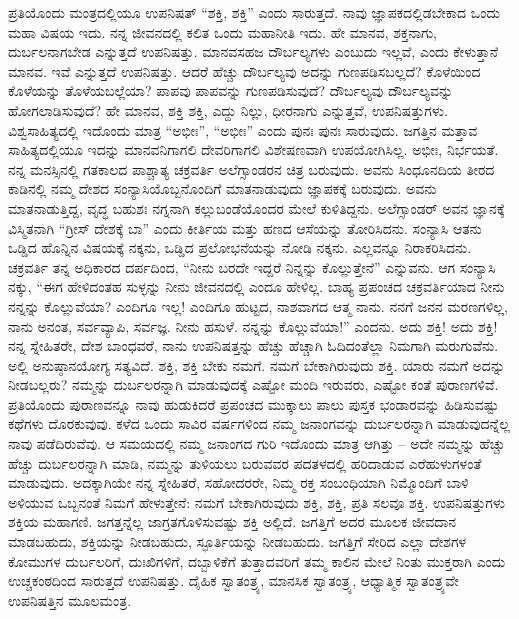 ಪ್ರತಿಯೊಂದು ಮಂತ್ರದಲ್ಲಿಯೂ ಉಪನಿಷತ್​ “ಶಕ್ತಿ, ಶಕ್ತಿ” ಎಂದು ಸಾರುತ್ತದೆ. ನಾವು ಜ್ಞಾಪಕದಲ್ಲಿಡಬೇಕಾದ ಒಂದು ಮಹಾ ವಿಷಯ ಇದು. ನನ್ನ ಜೀವನದಲ್ಲಿ ಕಲಿತ ಒಂದು ಮಹಾನೀತಿ ಇದು. ಹೇ ಮಾನವ, ಶಕ್ತನಾಗು, ದುರ್ಬಲನಾಗಬೇಡ ಎನ್ನುತ್ತದೆ ಉಪನಿಷತ್ತು. ಮಾನವಸಹಜ ದೌರ್ಬಲ್ಯಗಳು ಎಂಬುದು ಇಲ್ಲವೆ, ಎಂದು ಕೇಳುತ್ತಾನೆ ಮಾನವ. ಇವೆ ಎನ್ನುತ್ತದೆ ಉಪನಿಷತ್ತು. ಆದರೆ ಹೆಚ್ಚು ದೌರ್ಬಲ್ಯವು ಅದನ್ನು ಗುಣಪಡಿಸಬಲ್ಲದೆ? ಕೊಳೆಯಿಂದ ಕೊಳೆಯನ್ನು ತೊಳೆಯಬಲ್ಲೆಯಾ? ಪಾಪವು ಪಾಪವನ್ನು ಗುಣಪಡಿಸುವುದೆ? ದೌರ್ಬಲ್ಯವು ದೌರ್ಬಲ್ಯವನ್ನು ಹೋಗಲಾಡಿಸುವುದೆ? ಹೇ ಮಾನವ, ಶಕ್ತಿ ಶಕ್ತಿ, ಎದ್ದು ನಿಲ್ಲು, ಧೀರನಾಗು ಎನ್ನುತ್ತವೆ, ಉಪನಿಷತ್ತುಗಳು. ವಿಶ್ವಸಾಹಿತ್ಯದಲ್ಲಿ ಇದೊಂದು ಮಾತ್ರ “ಅಭೀಃ”, “ಅಭೀಃ” ಎಂದು ಪುನಃ ಪುನಃ ಸಾರುವುದು. ಜಗತ್ತಿನ ಮತ್ತಾವ ಸಾಹಿತ್ಯದಲ್ಲಿಯೂ ಇದನ್ನು ಮಾನವನಿಗಾಗಲಿ ದೇವರಿಗಾಗಲಿ ವಿಶೇಷಣವಾಗಿ ಉಪಯೋಗಿಸಿಲ್ಲ. ಅಭೀಃ, ನಿರ್ಭಯತೆ. ನನ್ನ ಮನಸ್ಸಿನಲ್ಲಿ ಗತಕಾಲದ ಪಾಶ್ಚಾತ್ಯ ಚಕ್ರವರ್ತಿ ಅಲೆಗ್ಸಾಂಡರನ ಚಿತ್ರ ಬರುವುದು. ಅವನು ಸಿಂಧೂನದಿಯ ತೀರದ ಕಾಡಿನಲ್ಲಿ ನಮ್ಮ ದೇಶದ ಸಂನ್ಯಾಸಿಯೊಬ್ಬನೊಂದಿಗೆ ಮಾತನಾಡುವುದು ಜ್ಞಾಪಕಕ್ಕೆ ಬರುವುದು. ಅವನು ಮಾತನಾಡುತ್ತಿದ್ದ, ವೃದ್ಧ ಬಹುಶಃ ನಗ್ನನಾಗಿ ಕಲ್ಲುಬಂಡೆಯೊಂದರ ಮೇಲೆ ಕುಳಿತಿದ್ದನು. ಅಲೆಗ್ಸಾಂಡರ್​ ಅವನ ಜ್ಞಾನಕ್ಕೆ ವಿಸ್ಮಿತನಾಗಿ “ಗ್ರೀಸ್​ ದೇಶಕ್ಕೆ ಬಾ” ಎಂದು ಕೀರ್ತಿಯ ಮತ್ತು ಹಣದ ಆಸೆಯನ್ನು ತೋರಿಸಿದನು. ಸಂನ್ಯಾಸಿ ಆತನು ಒಡ್ಡಿದ ಹೊನ್ನಿನ ವಿಷಯಕ್ಕೆ ನಕ್ಕನು, ಒಡ್ಡಿದ ಪ್ರಲೋಭನೆಯನ್ನು ನೋಡಿ ನಕ್ಕನು. ಎಲ್ಲವನ್ನೂ ನಿರಾಕರಿಸಿದನು. ಚಕ್ರವರ್ತಿ ತನ್ನ ಅಧಿಕಾರದ ದರ್ಪದಿಂದ, “ನೀನು ಬರದೇ ಇದ್ದರೆ ನಿನ್ನನ್ನು ಕೊಲ್ಲುತ್ತೇನೆ” ಎನ್ನುವನು. ಆಗ ಸಂನ್ಯಾಸಿ ನಕ್ಕು, “ಈಗ ಹೇಳಿದಂತಹ ಸುಳ್ಳನ್ನು ನೀನು ಜೀವನದಲ್ಲಿ ಎಂದೂ ಹೇಳಿಲ್ಲ. ಬಾಹ್ಯ ಪ್ರಪಂಚದ ಚಕ್ರವರ್ತಿಯಾದ ನೀನು ನನ್ನನ್ನು ಕೊಲ್ಲುವೆಯಾ? ಎಂದಿಗೂ ಇಲ್ಲ! ಎಂದಿಗೂ ಹುಟ್ಟದ, ನಾಶವಾಗದ ಆತ್ಮ ನಾನು. ನನಗೆ ಜನನ ಮರಣಗಳಿಲ್ಲ, ನಾನು ಅನಂತ, ಸರ್ವವ್ಯಾಪಿ, ಸರ್ವಜ್ಞ. ನೀನು ಹಸುಳೆ. ನನ್ನನ್ನು ಕೊಲ್ಲುವೆಯಾ!” ಎಂದನು. ಅದು ಶಕ್ತಿ! ಅದು ಶಕ್ತಿ! ನನ್ನ ಸ್ನೇಹಿತರೇ, ದೇಶ ಬಾಂಧವರೆ, ನಾನು ಉಪನಿಷತ್ತನ್ನು ಹೆಚ್ಚು ಹೆಚ್ಚಾಗಿ ಓದಿದಂತೆಲ್ಲಾ ನಿಮಗಾಗಿ ಮರುಗುವೆನು. ಅಲ್ಲಿ ಅನುಷ್ಠಾನಯೋಗ್ಯ ಸತ್ಯವಿದೆ. ಶಕ್ತಿ, ಶಕ್ತಿ ಬೇಕು ನಮಗೆ. ನಮಗೆ ಬೇಕಾಗಿರುವುದು ಶಕ್ತಿ. ಯಾರು ನಮಗೆ ಅದನ್ನು ನೀಡಬಲ್ಲರು? ನಮ್ಮನ್ನು ದುರ್ಬಲರನ್ನಾಗಿ ಮಾಡುವುದಕ್ಕೆ ಎಷ್ಟೋ ಮಂದಿ ಇರುವರು, ಎಷ್ಟೋ ಕಂತೆ ಪುರಾಣಗಳಿವೆ. ಪ್ರತಿಯೊಂದು ಪುರಾಣವನ್ನೂ ನಾವು ಹುಡುಕಿದರೆ ಪ್ರಪಂಚದ ಮುಕ್ಕಾಲು ಪಾಲು ಪುಸ್ತಕ ಭಂಡಾರವನ್ನು ಹಿಡಿಸುವಷ್ಟು ಕಥೆಗಳು ದೊರಕುವುವು. ಕಳೆದ ಒಂದು ಸಾವಿರ ವರ್ಷಗಳಿಂದ ನಮ್ಮ ಜನಾಂಗವನ್ನು ದುರ್ಬಲರನ್ನಾಗಿ ಮಾಡುವುದನ್ನೆಲ್ಲ ನಾವು ಪಡೆದಿರುವೆವು. ಆ ಸಮಯದಲ್ಲಿ ನಮ್ಮ ಜನಾಂಗದ ಗುರಿ ಇದೊಂದು ಮಾತ್ರ ಆಗಿತ್ತು – ಅದೇ ನಮ್ಮನ್ನು ಹೆಚ್ಚು ಹೆಚ್ಚು ದುರ್ಬಲರನ್ನಾಗಿ ಮಾಡಿ, ನಮ್ಮನ್ನು ತುಳಿಯಲು ಬರುವವರ ಪದತಳದಲ್ಲಿ ಹರಿದಾಡುವ ಎರೆಹುಳುಗಳಂತೆ ಮಾಡುವುದು. ಅದಕ್ಕಾಗಿಯೇ ನನ್ನ ಸ್ನೇಹಿತರೆ, ಸಹೋದರರೇ, ನಿಮ್ಮ ರಕ್ತ ಸಂಬಂಧಿಯಾಗಿ ನಿಮ್ಮೊಂದಿಗೆ ಬಾಳಿ ಅಳಿಯುವ ಒಬ್ಬನಂತೆ ನಿಮಗೆ ಹೇಳುತ್ತೇನೆ: ನಮಗೆ ಬೇಕಾಗಿರುವುದು ಶಕ್ತಿ, ಶಕ್ತಿ, ಪ್ರತಿ ಸಲವೂ ಶಕ್ತಿ. ಉಪನಿಷತ್ತುಗಳು ಶಕ್ತಿಯ ಮಹಾಗಣಿ. ಜಗತ್ತನ್ನೆಲ್ಲ ಜಾಗ್ರತಗೊಳಿಸುವಷ್ಟು ಶಕ್ತಿ ಅಲ್ಲಿದೆ. ಜಗತ್ತಿಗೆ ಅದರ ಮೂಲಕ ಜೀವದಾನ ಮಾಡಬಹುದು, ಶಕ್ತಿಯನ್ನು ನೀಡಬಹುದು, ಸ್ಫೂರ್ತಿಯನ್ನು ನೀಡಬಹುದು. ಜಗತ್ತಿಗೆ ಸೇರಿದ ಎಲ್ಲಾ ದೇಶಗಳ ಕೋಮುಗಳ ದುರ್ಬಲರಿಗೆ, ದುಃಖಿಗಳಿಗೆ, ದಬ್ಬಾಳಿಕೆಗೆ ತುತ್ತಾದವರಿಗೆ ತಮ್ಮ ಕಾಲಿನ ಮೇಲೆ ನಿಂತು ಮುಕ್ತರಾಗಿ ಎಂದು ಉಚ್ಚ\break ಕಂಠದಿಂದ ಸಾರುತ್ತದೆ ಉಪನಿಷತ್ತು. ದೈಹಿಕ ಸ್ವಾತಂತ್ರ್ಯ, ಮಾನಸಿಕ ಸ್ವಾತಂತ್ರ್ಯ, ಆಧ್ಯಾತ್ಮಿಕ ಸ್ವಾತಂತ್ರ್ಯವೇ ಉಪನಿಷತ್ತಿನ ಮೂಲಮಂತ್ರ.


